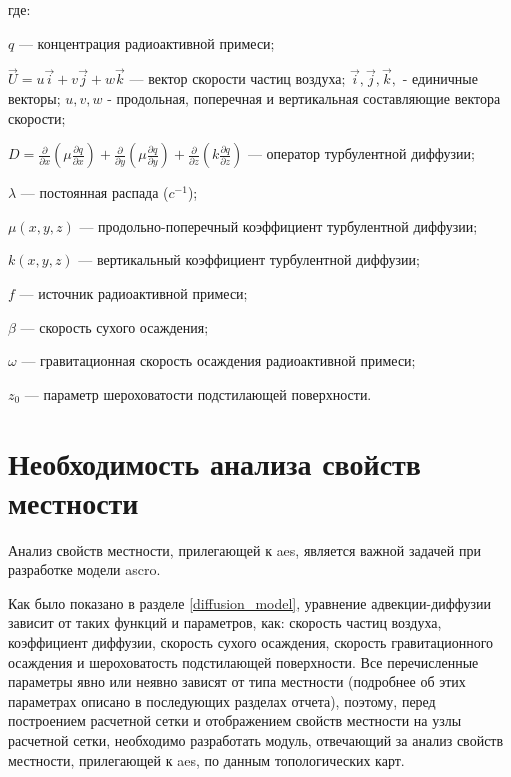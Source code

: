 где:
\begin{description}
    \item $q$ --- концентрация радиоактивной примеси;
    \item $\vec{U}=u\vec{i} + v\vec{j} + w\vec{k}$ --- вектор скорости частиц воздуха; $\vec{i}, \vec{j}, \vec{k},$ 
    	- единичные векторы; $u, v, w$ - продольная, поперечная и вертикальная составляющие вектора скорости; 
    \item $D = \frac{\partial}{\partial x}(\mu \frac{\partial q}{\partial x}) 
    	+ \frac{\partial}{\partial y}(\mu \frac{\partial q}{\partial y})
    	+ \frac{\partial}{\partial z}(k \frac{\partial q}{\partial z})$ --- оператор турбулентной диффузии; 
    \item $\lambda$ --- постоянная распада ($c^{-1}$);
    \item $\mu(x,y,z)$ --- продольно-поперечный коэффициент турбулентной диффузии;
    \item $k(x,y,z)$ --- вертикальный коэффициент турбулентной диффузии;
    \item $f$ --- источник радиоактивной примеси;
    \item $\beta$ --- скорость сухого осаждения;
    \item $\omega$ --- гравитационная скорость осаждения радиоактивной примеси;
    \item $z_{0}$ --- параметр шероховатости подстилающей поверхности.
\end{description}

\section{Необходимость анализа свойств местности}

Анализ свойств местности, прилегающей к \ac{aes}, является важной задачей при разработке модели \ac{ascro}. 

Как было показано в разделе \ref{diffusion_model}, уравнение адвекции-диффузии зависит от таких функций и параметров, 
как: скорость частиц воздуха, коэффициент диффузии, скорость сухого осаждения, скорость гравитационного осаждения и 
шероховатость подстилающей поверхности. Все перечисленные параметры явно или неявно зависят от типа местности (подробнее 
об этих параметрах описано в последующих разделах отчета), поэтому, перед построением расчетной сетки и отображением 
свойств местности на узлы расчетной сетки, необходимо разработать модуль, отвечающий за анализ свойств местности, 
прилегающей к \ac{aes}, по данным топологических карт.

